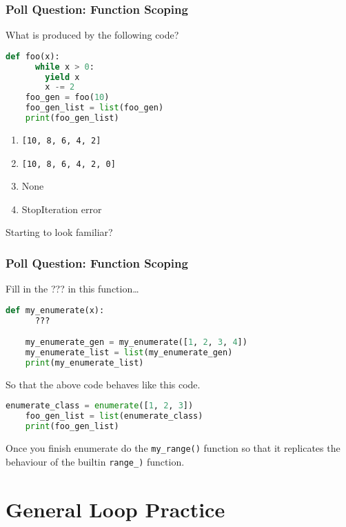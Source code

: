 \documentclass{beamer}
\begin{document}
%
%
\begin{frame}[fragile]
  \frametitle{Poll Question: Function Scoping}
  \begin{minipage}{0.6\textwidth}
    What is produced by the following code?
    \begin{lstlisting}[language=Python, autogobble]
    def foo(x):
      while x > 0:
        yield x
        x -= 2
    foo_gen = foo(10)
    foo_gen_list = list(foo_gen)
    print(foo_gen_list)
    \end{lstlisting}
  \end{minipage}
  \hfill
  \begin{minipage}{0.39\textwidth}
    \begin{enumerate}[A]
      \item \lstinline|[10, 8, 6, 4, 2]|
      \item \lstinline|[10, 8, 6, 4, 2, 0]|
      \item None
      \item StopIteration error
    \end{enumerate}
  \end{minipage}
  \pause
  \vfill
  Starting to look familiar?
\end{frame}

%
%
\begin{frame}[fragile]
  \frametitle{Poll Question: Function Scoping}
  Fill in the ??? in this function\ldots
  \begin{lstlisting}[language=Python, autogobble]
    def my_enumerate(x):
      ???

    my_enumerate_gen = my_enumerate([1, 2, 3, 4])
    my_enumerate_list = list(my_enumerate_gen)
    print(my_enumerate_list)
  \end{lstlisting}
  \vfill
  So that the above code behaves like this code. 
  \begin{lstlisting}[language=Python, autogobble]
    enumerate_class = enumerate([1, 2, 3])
    foo_gen_list = list(enumerate_class)
    print(foo_gen_list)
  \end{lstlisting}
  \vfill
  Once you finish enumerate do the \lstinline|my_range()| function so that it replicates the behaviour of the builtin \lstinline|range_)| function.
\end{frame}


\section{General Loop Practice}
\end{document}
